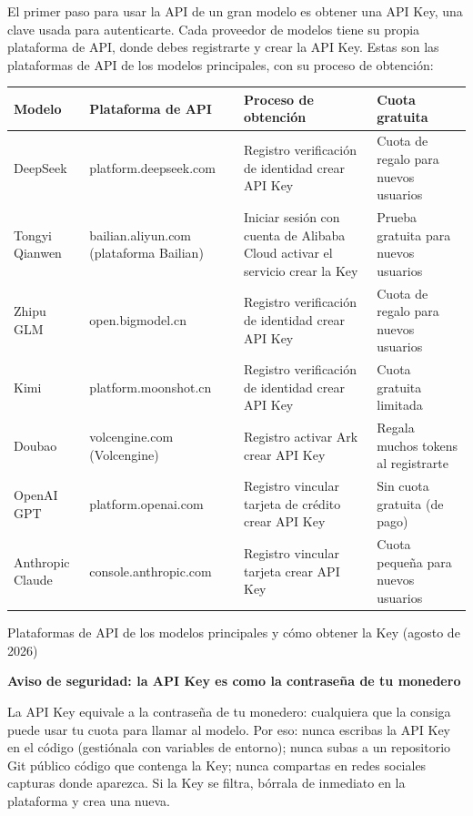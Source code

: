 
El primer paso para usar la API de un gran modelo es obtener una API Key, una clave usada para autenticarte. Cada proveedor de modelos tiene su propia plataforma de API, donde debes registrarte y crear la API Key. Estas son las plataformas de API de los modelos principales, con su proceso de obtención:

\begin{center}
\begin{tabularx}{\linewidth}{|X|X|X|X|}
\hline
\textbf{Modelo} & \textbf{Plataforma de API} & \textbf{Proceso de obtención} & \textbf{Cuota gratuita} \tabularnewline
\hline
DeepSeek & platform.deepseek.com & Registro verificación de identidad crear API Key & Cuota de regalo para nuevos usuarios \tabularnewline
Tongyi Qianwen & bailian.aliyun.com (plataforma Bailian) & Iniciar sesión con cuenta de Alibaba Cloud activar el servicio crear la Key & Prueba gratuita para nuevos usuarios \tabularnewline
Zhipu GLM & open.bigmodel.cn & Registro verificación de identidad crear API Key & Cuota de regalo para nuevos usuarios \tabularnewline
Kimi & platform.moonshot.cn & Registro verificación de identidad crear API Key & Cuota gratuita limitada \tabularnewline
Doubao & volcengine.com (Volcengine) & Registro activar Ark crear API Key & Regala muchos tokens al registrarte \tabularnewline
OpenAI GPT & platform.openai.com & Registro vincular tarjeta de crédito crear API Key & Sin cuota gratuita (de pago) \tabularnewline
Anthropic Claude & console.anthropic.com & Registro vincular tarjeta crear API Key & Cuota pequeña para nuevos usuarios \tabularnewline
\hline
\end{tabularx}
\end{center}

\begin{center}\small\color{gray}Plataformas de API de los modelos principales y cómo obtener la Key (agosto de 2026)\end{center}

\textbf{Aviso de seguridad: la API Key es como la contraseña de tu monedero}\par

La API Key equivale a la contraseña de tu monedero: cualquiera que la consiga puede usar tu cuota para llamar al modelo. Por eso: nunca escribas la API Key en el código (gestiónala con variables de entorno); nunca subas a un repositorio Git público código que contenga la Key; nunca compartas en redes sociales capturas donde aparezca. Si la Key se filtra, bórrala de inmediato en la plataforma y crea una nueva.

